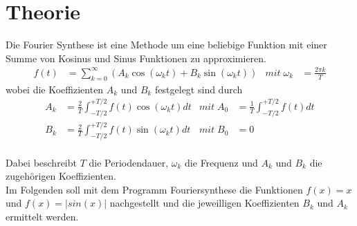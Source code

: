 \section{Theorie}
\label{sec:Theorie}
Die Fourier Synthese ist eine Methode um eine beliebige Funktion mit einer Summe von Kosinus und Sinus Funktionen zu approximieren.
\begin{align}
    f(t) &= \sum_{k=0}^{\infty} (A_k\cos(\omega_k t)+B_k\sin(\omega_k t)) &   mit \; \omega_k &= \frac{2\pi k}{T} \label{eqn:Fourier}
\end{align}
wobei die Koeffizienten $A_k$ und $B_k$ festgelegt sind durch
\begin{align}
    A_k &= \frac{2}{T} \int_{-T/2}^{+T/2} f(t)\cos(\omega_k t) dt    &  mit \; A_0 &= \frac{1}{T} \int_{-T/2}^{+T/2} f(t) dt \label{eqn:Ak}\\
    B_k &= \frac{2}{T} \int_{-T/2}^{+T/2} f(t)\sin(\omega_k t) dt    &  mit \; B_0 &= 0 \label{eqn:Bk}
\end{align}
\\
Dabei beschreibt $T$ die Periodendauer, $\omega_k$ die Frequenz und $A_k$ und $B_k$ die zugehörigen Koeffizienten. \\
Im Folgenden soll mit dem Programm Fouriersynthese %
die Funktionen $f(x)=x$ und $f(x)=|sin(x)|$ nachgestellt und die jeweilligen Koeffizienten $B_k$ und $A_k$ ermittelt werden.
